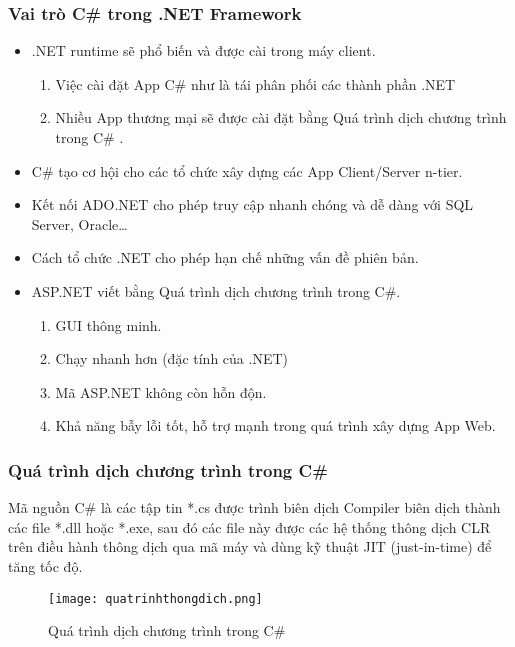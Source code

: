 \subsubsection*{Vai trò C\#  trong .NET Framework}
\begin{itemize}
	\item .NET runtime sẽ phổ biến và được cài trong máy client.
	\begin{enumerate}
		\item Việc cài đặt App C\#  như là tái phân phối các thành phần .NET
		\item Nhiều App thương mại sẽ được cài đặt bằng Quá trình dịch chương trình trong C\# .
	\end{enumerate}
	\item C\# tạo cơ hội cho các tổ chức xây dựng các App Client/Server n-tier.
	\item Kết nối ADO.NET cho phép truy cập nhanh chóng và dễ dàng với SQL Server, Oracle…
	\item Cách tổ chức .NET cho phép hạn chế những vấn đề phiên bản.
	\item ASP.NET viết bằng Quá trình dịch chương trình trong C\#.
	\begin{enumerate}
		\item GUI thông minh.
		\item Chạy nhanh hơn (đặc tính của .NET)
		\item Mã ASP.NET không còn hỗn độn.
		\item Khả năng bẫy lỗi tốt, hỗ trợ mạnh trong quá trình xây dựng App Web.
	\end{enumerate}
\end{itemize}

\subsubsection*{Quá trình dịch chương trình trong C\# }
Mã nguồn C\# là các tập tin *.cs được trình biên dịch Compiler biên dịch thành các file *.dll hoặc *.exe, sau đó các file này được các hệ thống thông dịch CLR trên điều hành thông dịch qua mã máy và dùng kỹ thuật JIT (just-in-time) để tăng tốc độ.

\begin{center}
	\begin{figure}[htp]
		\begin{center}
			\texttt{[image: quatrinhthongdich.png]}
		\end{center}
		\caption{Quá trình dịch chương trình trong C\#}
		
	\end{figure}
\end{center}

